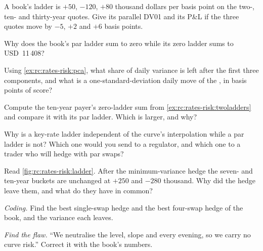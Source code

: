 \begin{exercise}[$\star$]\label{exo:rc:rates-risk:1}
A book's ladder is $+50$, $-120$, $+80$ thousand dollars per basis point on
the two-, ten- and thirty-year quotes. Give its parallel DV01 and its P\&L if
the three quotes move by $-5$, $+2$ and $+6$ basis points.
\end{exercise}

\begin{exercise}[$\star$]\label{exo:rc:rates-risk:2}
Why does the book's par ladder sum to zero while its zero ladder sums to
USD~11\,408?
\end{exercise}

\begin{exercise}[$\star$]\label{exo:rc:rates-risk:3}
Using \cref{ex:rc:rates-risk:pca}, what share of daily variance is left after
the first three components, and what is a one-standard-deviation daily move of
the , in basis points of score?
\end{exercise}

\begin{exercise}[$\star\star$]\label{exo:rc:rates-risk:4}
Compute the ten-year payer's zero-ladder sum from \cref{ex:rc:rates-risk:twoladders}
and compare it with its par ladder. Which is larger, and why?
\end{exercise}

\begin{exercise}[$\star\star$]\label{exo:rc:rates-risk:5}
Why is a key-rate ladder independent of the curve's interpolation while a par
ladder is not? Which one would you send to a regulator, and which one to a
trader who will hedge with par swaps?
\end{exercise}

\begin{exercise}[$\star\star$]\label{exo:rc:rates-risk:6}
Read \cref{fig:rc:rates-risk:ladder}. After the minimum-variance hedge the
seven- and ten-year buckets are unchanged at $+250$ and $-280$ thousand. Why
did the hedge leave them, and what do they have in common?
\end{exercise}

\begin{exercise}[$\star\star\star$]\label{exo:rc:rates-risk:7}
\emph{Coding.} Find the best single-swap hedge and the best four-swap hedge of
the book, and the variance each leaves.
\end{exercise}

\begin{exercise}[$\star\star\star$]\label{exo:rc:rates-risk:8}
\emph{Find the flaw.} ``We neutralise the level, slope and 
every evening, so we carry no curve risk.'' Correct it with the book's numbers.
\end{exercise}

